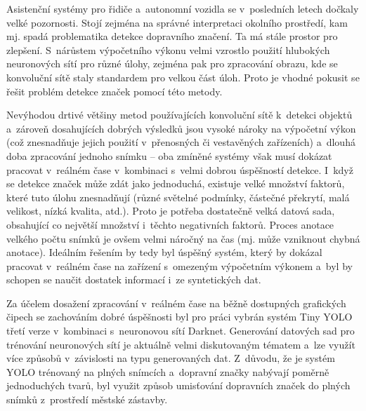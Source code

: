 Asistenční systémy pro řidiče a~autonomní vozidla se v~posledních letech dočkaly velké pozornosti. Stojí zejména na správné interpretaci okolního prostředí, kam mj. spadá problematika detekce dopravního značení. Ta má stále prostor pro zlepšení. S~nárůstem výpočetního výkonu velmi vzrostlo použití hlubokých neuronových sítí pro různé úlohy, zejména pak pro zpracování obrazu, kde se konvoluční sítě staly standardem pro velkou část úloh. Proto je vhodné pokusit se řešit problém detekce značek pomocí této metody.


Nevýhodou drtivé většiny metod používajících konvoluční sítě k~detekci objektů a~zároveň dosahujících dobrých výsledků jsou vysoké nároky na výpočetní výkon (což znesnadňuje jejich použití v~přenosných či vestavěných zařízeních) a~dlouhá doba zpracování jednoho snímku -- oba zmíněné systémy však musí dokázat pracovat v~reálném čase v~kombinaci s~velmi dobrou úspěšností detekce.
I~když se detekce značek může zdát jako jednoduchá, existuje velké množství faktorů, které tuto úlohu znesnadňují (různé světelné podmínky, částečné překrytí, malá velikost, nízká kvalita, atd.). Proto je potřeba dostatečně velká datová sada, obsahující co největší množství i~těchto negativních faktorů. Proces anotace velkého počtu snímků je ovšem velmi náročný na čas (mj. může vzniknout chybná anotace).
Ideálním řešením by tedy byl úspěšný systém, který by dokázal pracovat v~reálném čase na zařízení s~omezeným výpočetním výkonem a~byl by schopen se naučit dostatek informací i~ze syntetických dat.


Za účelem dosažení zpracování v~reálném čase na běžně dostupných grafických čipech se zachováním dobré úspěšnosti byl pro práci vybrán systém Tiny YOLO třetí verze v~kombinaci s~neuronovou sítí Darknet.
Generování datových sad pro trénování neuronových sítí je aktuálně velmi diskutovaným tématem a~lze využít více způsobů v~závislosti na typu generovaných dat. Z~důvodu, že je systém YOLO trénovaný na plných snímcích a~dopravní značky nabývají poměrně jednoduchých tvarů, byl využit způsob umisťování dopravních značek do plných snímků z~prostředí městské zástavby.


